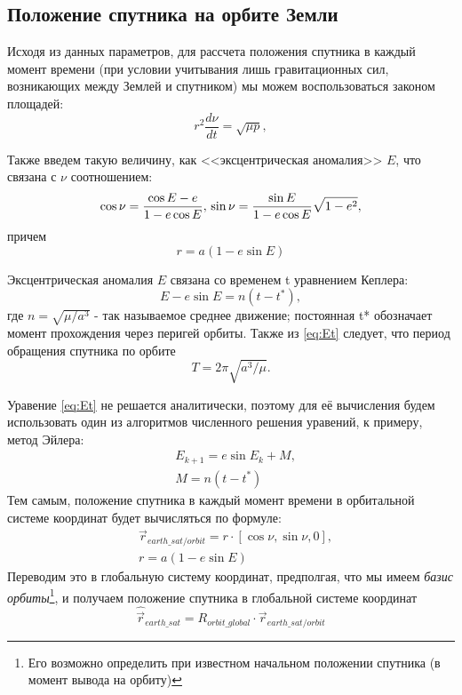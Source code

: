 \documentclass[tikz, a4paper,12pt]{extreport}
\begin{document}
  \subsection{Положение спутника на орбите Земли}
  \noindent\indent Исходя из данных параметров, для рассчета положения спутника в каждый момент времени
  (при условии учитывания лишь гравитационных сил, возникающих между Землей и спутником)
  мы можем воспользоваться законом площадей:
  \begin{equation}
    r^2 \frac{d\nu}{dt} = \sqrt{\mu p},
  \end{equation}\par
  Также введем такую величину, как <<эксцентрическая аномалия>> $E$, что связана с $\nu$ соотношением:
  \begin{equation}
    \cos{\nu} = \frac{\cos{E} - e}{1 - e\cos{E}}, \\
    \sin{\nu} = \frac{\sin{E}}{1 - e\cos{E}}\sqrt{1 - e^2},
  \end{equation}
  причем
  \begin{equation}
    r = a(1 - e\sin{E})
  \end{equation}\par
  Эксцентрическая аномалия $E$ связана со временем t уравнением Кеплера:
  \begin{equation} \label{eq:Et}
    E - e\sin{E} = n(t - t^*),
  \end{equation}
  где $n = \sqrt{\mu/a^3}$ - так называемое среднее движение; постоянная t*
  обозначает момент прохождения через перигей орбиты. Также из \ref{eq:Et} следует,
  что период обращения спутника по орбите
  \begin{equation}
    T = 2\pi\sqrt{a^3/\mu}.
  \end{equation}\par
  Уравение \ref{eq:Et} не решается аналитически, поэтому для её вычисления будем использовать
  один из алгоритмов численного решения уравений, к примеру, метод Эйлера:
  \begin{equation}
    \begin{aligned}
      & E_{k+1} = e\sin{E_k} + M, \\
      & M = n(t - t^*)
    \end{aligned}
  \end{equation}
  Тем самым, положение спутника в каждый момент времени в орбитальной системе координат
  будет вычисляться по формуле:
  \begin{equation}
    \begin{aligned}
      & \vec{r}_{earth\_sat/orbit} = r \cdot [\cos{\nu}, \sin{\nu}, 0], \\
      & r = a(1 - e\sin{E})
    \end{aligned}
  \end{equation}
  Переводим это в глобальную систему координат, предполгая, что мы имеем \textit{базис орбиты}\footnote{
    Его возможно определить при известном начальном положении спутника (в момент вывода на орбиту)
  }, и получаем положение спутника в глобальной системе координат
  \begin{equation} \label{eq:REarthSat}
    \hat{\vec{r}}_{earth\_sat} = R_{orbit\_global} \cdot \vec{r}_{earth\_sat/orbit}
  \end{equation}
\end{document}

